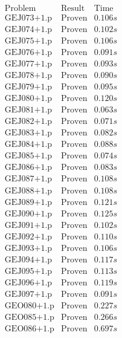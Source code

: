 \documentclass[a4paper,11pt]{report}
\theoremstyle{definition}
\theoremstyle{definition}
\theoremstyle{definition}
\theoremstyle{definition}
\theoremstyle{definition}
\theoremstyle{definition}
\theoremstyle{definition}
\begin{document}
	\begin{minipage}{0.45\textwidth}
		\[\begin{matrix}
			\text{Problem}&\text{Result}&\text{Time}\\
			\text{GEJ073+1.p}&\text{Proven}& 0.106 s\\
			\text{GEJ074+1.p}&\text{Proven}& 0.102 s\\
			\text{GEJ075+1.p}&\text{Proven}& 0.106 s\\
			\text{GEJ076+1.p}&\text{Proven}& 0.091 s\\
			\text{GEJ077+1.p}&\text{Proven}& 0.093 s\\
			\text{GEJ078+1.p}&\text{Proven}& 0.090 s\\
			\text{GEJ079+1.p}&\text{Proven}& 0.095 s\\
			\text{GEJ080+1.p}&\text{Proven}& 0.120 s\\
			\text{GEJ081+1.p}&\text{Proven}& 0.063 s\\
			\text{GEJ082+1.p}&\text{Proven}& 0.071 s\\
			\text{GEJ083+1.p}&\text{Proven}& 0.082 s\\
			\text{GEJ084+1.p}&\text{Proven}& 0.088 s\\
			\text{GEJ085+1.p}&\text{Proven}& 0.074 s\\
			\text{GEJ086+1.p}&\text{Proven}& 0.083 s\\
			\text{GEJ087+1.p}&\text{Proven}& 0.108 s\\
			\text{GEJ088+1.p}&\text{Proven}& 0.108 s\\
			\text{GEJ089+1.p}&\text{Proven}& 0.121 s\\
			\text{GEJ090+1.p}&\text{Proven}& 0.125 s\\
			\text{GEJ091+1.p}&\text{Proven}& 0.102 s\\
			\text{GEJ092+1.p}&\text{Proven}& 0.110 s\\
			\text{GEJ093+1.p}&\text{Proven}& 0.106 s\\
			\text{GEJ094+1.p}&\text{Proven}& 0.117 s\\
			\text{GEJ095+1.p}&\text{Proven}& 0.113 s\\
			\text{GEJ096+1.p}&\text{Proven}& 0.119 s\\
			\text{GEJ097+1.p}&\text{Proven}& 0.091 s\\
			\text{GEO080+1.p}&\text{Proven}& 0.227 s\\
			\text{GEO085+1.p}&\text{Proven}& 0.266 s\\
			\text{GEO086+1.p}&\text{Proven}& 0.697 s\\

\end{matrix}\]
\end{minipage}
\end{document}
